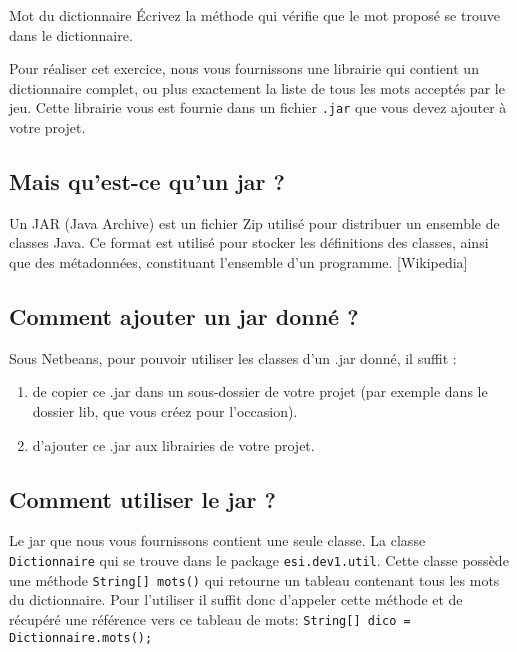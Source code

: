 \documentclass[a4paper,11pt]{article}
\begin{document}
 	\begin{Exercice}{Mot du dictionnaire}
 	 			\'Ecrivez la méthode 
		qui vérifie que le mot proposé se trouve dans le dictionnaire.
				
		Pour réaliser cet exercice, nous vous fournissons une librairie qui contient 
		un dictionnaire complet, ou plus exactement la liste de tous les mots
		acceptés par le jeu. Cette librairie vous est fournie dans un fichier
		 \texttt{.jar} que vous devez ajouter à votre projet.		
		
		\subsection*{Mais qu’est-ce qu’un jar ?}
			Un JAR (Java Archive) est un fichier Zip utilisé pour distribuer un 
			ensemble de classes Java. Ce format est utilisé pour stocker les 
			définitions des classes, ainsi que des métadonnées, constituant 
			l’ensemble d’un programme. [Wikipedia]
			
		\subsection*{Comment ajouter un jar donné ?}

		Sous Netbeans, pour pouvoir utiliser les classes d’un .jar donné, il suffit :
		
		\begin{enumerate}
		 	\item de copier ce .jar dans un sous-dossier de votre projet (par exemple
				dans le dossier lib, que vous créez pour l’occasion).
			\item d’ajouter ce .jar aux librairies de votre projet.
		\end{enumerate}
		
		\subsection*{Comment utiliser le jar ?}
			Le jar que nous vous fournissons contient une seule classe.
			La classe \texttt{Dictionnaire} qui se trouve dans le package 
			\texttt{esi.dev1.util}. Cette classe possède une méthode 
			\texttt{String[] mots()} qui retourne un tableau contenant tous les mots
			du dictionnaire. Pour l'utiliser il suffit donc d'appeler cette méthode
			et de récupéré une référence vers ce tableau de mots:
			\texttt{String[] dico = Dictionnaire.mots();}			
			
	\end{Exercice} 
\end{document}

